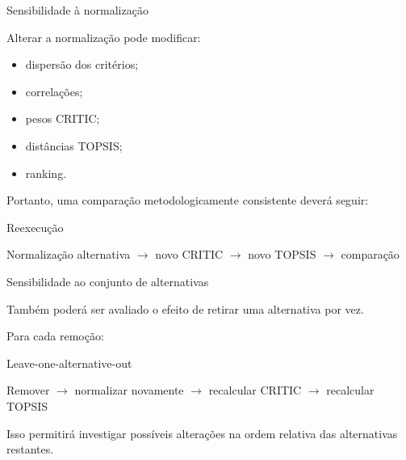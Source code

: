 
\begin{frame}{Sensibilidade à normalização}

    Alterar a normalização pode modificar:

    \begin{itemize}
        \item dispersão dos critérios;
        \item correlações;
        \item pesos CRITIC;
        \item distâncias TOPSIS;
        \item ranking.
    \end{itemize}

    \vspace{0.3cm}

    Portanto, uma comparação metodologicamente consistente deverá
    seguir:

    \begin{block}{Reexecução}
        \centering

        Normalização alternativa
        $\rightarrow$
        novo CRITIC
        $\rightarrow$
        novo TOPSIS
        $\rightarrow$
        comparação
    \end{block}

\end{frame}



\begin{frame}{Sensibilidade ao conjunto de alternativas}

    Também poderá ser avaliado o efeito de retirar uma alternativa
    por vez.

    \vspace{0.3cm}

    Para cada remoção:

    \begin{block}{Leave-one-alternative-out}
        \centering

        Remover
        $\rightarrow$
        normalizar novamente
        $\rightarrow$
        recalcular CRITIC
        $\rightarrow$
        recalcular TOPSIS
    \end{block}

    \vspace{0.4cm}

    Isso permitirá investigar possíveis alterações na ordem relativa
    das alternativas restantes.

\end{frame}


